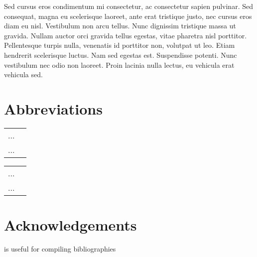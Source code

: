 \documentclass[output=paper,colorlinks,citecolor=brown,
]{langscibook}
\begin{document}
Sed cursus eros condimentum mi consectetur, ac consectetur sapien pulvinar. Sed consequat, magna eu scelerisque laoreet, ante erat tristique justo, nec cursus eros diam eu nisl. Vestibulum non arcu tellus. Nunc dignissim tristique massa ut gravida. Nullam auctor orci gravida tellus egestas, vitae pharetra nisl porttitor. Pellentesque turpis nulla, venenatis id porttitor non, volutpat ut leo. Etiam hendrerit scelerisque luctus. Nam sed egestas est. Suspendisse potenti. Nunc vestibulum nec odio non laoreet. Proin lacinia nulla lectus, eu vehicula erat vehicula sed.


\section*{Abbreviations}
\begin{tabularx}{.5\textwidth}{@{}lQ@{}}
... & \\
... & \\
\end{tabularx}%
\begin{tabularx}{.5\textwidth}{@{}lQ@{}}
... & \\
... & \\
\end{tabularx}

\section*{Acknowledgements}
\citet{Nordhoff2018} is useful for compiling bibliographies

\sloppy
\printbibliography[heading=subbibliography,notkeyword=this]
\end{document}
